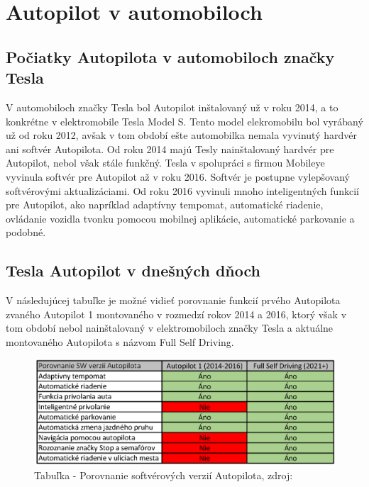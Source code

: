 \documentclass[10pt,twoside,slovak,a4paper]{article}
\begin{document}
\section{Autopilot v automobiloch} \label{PAVAZ}

\subsection{Počiatky Autopilota v automobiloch značky Tesla}

V automobiloch značky Tesla bol Autopilot inštalovaný už v roku 2014, a to konkrétne v elektromobile Tesla Model S. Tento model elekromobilu bol vyrábaný už od roku 2012, avšak v tom období ešte automobilka nemala vyvinutý hardvér ani softvér Autopilota. Od roku 2014 majú Tesly nainštalovaný hardvér pre Autopilot, nebol však stále funkčný. Tesla v spolupráci s firmou Mobileye vyvinula softvér pre Autopilot až v roku 2016. Softvér je postupne vylepšovaný softvérovými aktualizáciami. Od roku 2016 vyvinuli mnoho inteligentných funkcií pre Autopilot, ako napríklad adaptívny tempomat, automatické riadenie, ovládanie vozidla tvonku pomocou mobilnej aplikácie, automatické parkovanie a podobné.\cite{Skokan}

\subsection{Tesla Autopilot v dnešných dňoch}

V následujúcej tabuľke je možné vidieť porovnanie funkcií prvého Autopilota zvaného Autopilot 1 montovaného v rozmedzí rokov 2014 a 2016, ktorý však v tom období nebol nainštalovaný v elektromobiloch značky Tesla a aktuálne montovaného Autopilota s názvom Full Self Driving. 

\begin{figure}[tbh]
\centering
\includegraphics[scale=0.80]{tabulka.png}
\caption{Tabuľka - Porovnanie softvérových verzií Autopilota, zdroj:\cite{Skokan}}
\label{f:tabulka}
\end{figure}
\end{document}

